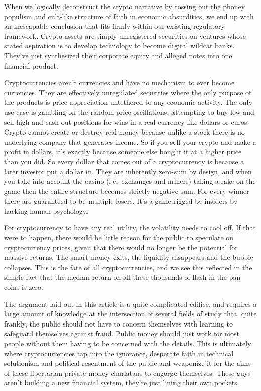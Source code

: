 \documentclass[
]{book}
\begin{document}
When we logically deconstruct the crypto narrative by tossing out the phoney populism and cult-like structure of faith in economic absurdities, we end up with an inescapable conclusion that fits firmly within our existing regulatory framework. Crypto assets are simply unregistered securities on ventures whose stated aspiration is to develop technology to become digital wildcat banks. They've just synthesized their corporate equity and alleged notes into one financial product.

Cryptocurrencies aren't currencies and have no mechanism to ever become currencies. They are effectively unregulated securities where the only purpose of the products is price appreciation untethered to any economic activity. The only use case is gambling on the random price oscillations, attempting to buy low and sell high and cash out positions for wins in a real currency like dollars or euros. Crypto cannot create or destroy real money because unlike a stock there is no underlying company that generates income. So if you sell your crypto and make a profit in dollars, it's exactly because someone else bought it at a higher price than you did. So every dollar that comes out of a cryptocurrency is because a later investor put a dollar in. They are inherently zero-sum by design, and when you take into account the casino (i.e.~exchanges and miners) taking a rake on the game then the entire structure becomes strictly negative-sum. For every winner there are guaranteed to be multiple losers. It's a game rigged by insiders by hacking human psychology.

For cryptocurrency to have any real utility, the volatility needs to cool off. If that were to happen, there would be little reason for the public to speculate on cryptocurrency prices, given that there would no longer be the potential for massive returns. The smart money exits, the liquidity disappears and the bubble collapses. This is the fate of all cryptocurrencies, and we see this reflected in the simple fact that the median return on all these thousands of flash-in-the-pan coins is zero.

The argument laid out in this article is a quite complicated edifice, and requires a large amount of knowledge at the intersection of several fields of study that, quite frankly, the public should not have to concern themselves with learning to safeguard themselves against fraud. Public money should just work for most people without them having to be concerned with the details. This is ultimately where cryptocurrencies tap into the ignorance, desperate faith in technical solutionism and political resentment of the public and weaponize it for the aims of these libertarian private money charlatans to engorge themselves. These guys aren't building a new financial system, they're just lining their own pockets.
\end{document}
